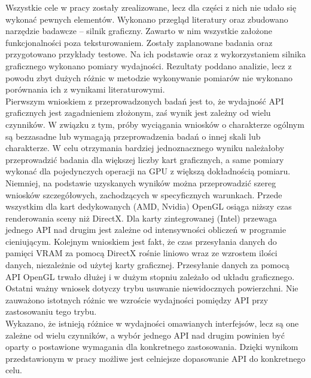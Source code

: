 \documentclass[archive]{mgr}
\begin{document}
Wszystkie cele w pracy zostały zrealizowane, lecz dla części z nich nie udało się wykonać pewnych elementów. Wykonano przegląd literatury oraz zbudowano narzędzie badawcze – silnik graficzny. Zawarto w nim wszystkie założone funkcjonalności poza teksturowaniem. Zostały zaplanowane badania oraz przygotowano przykłady testowe. Na ich podstawie oraz z wykorzystaniem silnika graficznego wykonano pomiary wydajności. Rezultaty poddano analizie, lecz z powodu zbyt dużych różnic w metodzie wykonywanie pomiarów nie wykonano porównania ich z wynikami literaturowymi.\\

Pierwszym wnioskiem z przeprowadzonych badań jest to, że wydajność API graficznych jest zagadnieniem złożonym, zaś wynik jest zależny od wielu czynników. W związku z tym, próby wyciągania wniosków o charakterze ogólnym są bezzasadne lub wymagają przeprowadzenia badań o innej skali lub charakterze. W celu otrzymania bardziej jednoznacznego wyniku należałoby przeprowadzić badania dla większej liczby kart graficznych, a same pomiary wykonać dla pojedynczych operacji na GPU z większą dokładnością pomiaru. Niemniej, na podstawie uzyskanych wyników można przeprowadzić szereg wniosków szczegółowych, zachodzących w specyficznych warunkach. Przede wszystkim dla kart dedykowanych (AMD, Nvidia) OpenGL osiąga niższy czas renderowania sceny niż DirectX. Dla karty zintegrowanej (Intel) przewaga jednego API nad drugim jest zależne od intensywności obliczeń w programie cieniującym. Kolejnym wnioskiem jest fakt, że czas przesyłania danych do pamięci VRAM za pomocą DirectX rośnie liniowo wraz ze wzrostem ilości danych, niezależnie od użytej karty graficznej. Przesyłanie danych za pomocą API OpenGL trwało dłużej i w dużym stopniu zależało od układu graficznego. Ostatni ważny wniosek dotyczy trybu usuwanie niewidocznych powierzchni. Nie zauważono istotnych różnic we wzroście wydajności pomiędzy API przy zastosowaniu tego trybu.\\

Wykazano, że istnieją różnice w wydajności omawianych interfejsów, lecz są one zależne od wielu czynników, a wybór jednego API nad drugim powinien być oparty o postawione wymagania dla konkretnego zastosowania. Dzięki wynikom przedstawionym w pracy możliwe jest celniejsze dopasowanie API do konkretnego celu.


\end{document}
